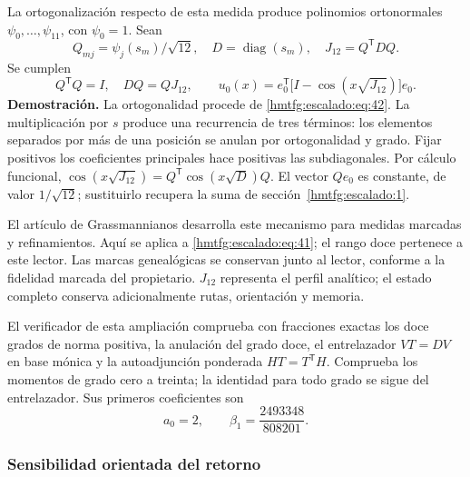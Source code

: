 La ortogonalización respecto de esta medida produce polinomios ortonormales \(\psi_0,\ldots,\psi_{11}\), con \(\psi_0=1\). Sean
\[
Q_{mj}=\psi_j(s_m)/\sqrt{12},\quad
D=\operatorname{diag}(s_m),\quad J_{12}=Q^{\mathsf T}DQ.
\]
Se cumplen
\begin{equation}
Q^{\mathsf T}Q=I,\quad DQ=QJ_{12},\qquad
\boxed{u_0(x)=e_0^{\mathsf T}
\bigl[I-\cos(x\sqrt{J_{12}})\bigr]e_0.}
\label{hmtfg:escalado:eq:43}
\end{equation}
\textbf{Demostración.} La ortogonalidad procede de \eqref{hmtfg:escalado:eq:42}. La multiplicación por \(s\) produce una recurrencia de tres términos: los elementos separados por más de una posición se anulan por ortogonalidad y grado. Fijar positivos los coeficientes principales hace positivas las subdiagonales. Por cálculo funcional,
\(\cos(x\sqrt{J_{12}})=Q^{\mathsf T}\cos(x\sqrt D)Q\).
El vector \(Qe_0\) es constante, de valor \(1/\sqrt{12}\); sustituirlo recupera la suma de sección~\ref{hmtfg:escalado:1}.

El artículo de Grassmannianos desarrolla este mecanismo para medidas marcadas y refinamientos. Aquí se aplica a \eqref{hmtfg:escalado:eq:41}; el rango doce pertenece a este lector. Las marcas genealógicas se conservan junto al lector, conforme a la fidelidad marcada del propietario. \(J_{12}\) representa el perfil analítico; el estado completo conserva adicionalmente rutas, orientación y memoria.

El verificador de esta ampliación comprueba con fracciones exactas los doce grados de norma positiva, la anulación del grado doce, el entrelazador \(VT=DV\) en base mónica y la autoadjunción ponderada \(HT=T^{\mathsf T}H\). Comprueba los momentos de grado cero a treinta; la identidad para todo grado se sigue del entrelazador. Sus primeros coeficientes son
\begin{equation}
a_0=2,\qquad \beta_1=\frac{2493348}{808201}.
\label{hmtfg:escalado:eq:44}
\end{equation}

\subsubsection{Sensibilidad orientada del retorno}
\label{hmtfg:escalado:14.3}

